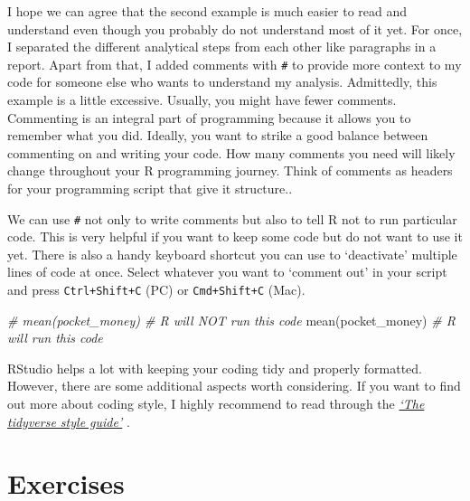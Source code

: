 \documentclass[
]{book}
\newenvironment{Shaded}{\begin{snugshade}}{\end{snugshade}}
\newcommand{\CommentTok}[1]{\textcolor[rgb]{0.56,0.35,0.01}{\textit{#1}}}
\newcommand{\FunctionTok}[1]{\textcolor[rgb]{0.00,0.00,0.00}{#1}}
\newcommand{\NormalTok}[1]{#1}
\begin{document}
I hope we can agree that the second example is much easier to read and understand even though you probably do not understand most of it yet. For once, I separated the different analytical steps from each other like paragraphs in a report. Apart from that, I added comments with \texttt{\#} to provide more context to my code for someone else who wants to understand my analysis. Admittedly, this example is a little excessive. Usually, you might have fewer comments. Commenting is an integral part of programming because it allows you to remember what you did. Ideally, you want to strike a good balance between commenting on and writing your code. How many comments you need will likely change throughout your R programming journey. Think of comments as headers for your programming script that give it structure..

We can use \texttt{\#} not only to write comments but also to tell R not to run particular code. This is very helpful if you want to keep some code but do not want to use it yet. There is also a handy keyboard shortcut you can use to `deactivate' multiple lines of code at once. Select whatever you want to `comment out' in your script and press \texttt{Ctrl+Shift+C} (PC) or \texttt{Cmd+Shift+C} (Mac).

\begin{Shaded}
\begin{Highlighting}[]
\CommentTok{\# mean(pocket\_money) \# R will NOT run this code}
\FunctionTok{mean}\NormalTok{(pocket\_money)   }\CommentTok{\# R will run this code}
\end{Highlighting}
\end{Shaded}

RStudio helps a lot with keeping your coding tidy and properly formatted. However, there are some additional aspects worth considering. If you want to find out more about coding style, I highly recommend to read through the \href{https://style.tidyverse.org}{\emph{`The tidyverse style guide'}} \citep{wickham-2021}.\\

\hypertarget{exercises-chapter-5}{%
\section{Exercises}\label{exercises-chapter-5}}
\end{document}
